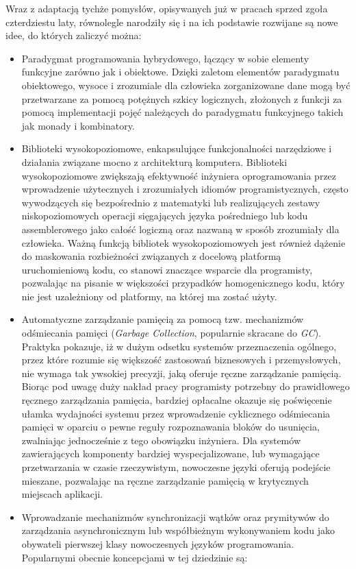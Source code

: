 \par{
Wraz z adaptacją tychże pomysłów, opisywanych już w pracach sprzed zgoła czterdziestu laty, równolegle narodziły się i na ich podstawie rozwijane są nowe idee, do których zaliczyć można:
\begin{itemize}
  \item Paradygmat programowania hybrydowego, łączący w sobie elementy funkcyjne zarówno jak i obiektowe. Dzięki zaletom elementów paradygmatu obiektowego, wysoce i zrozumiale dla człowieka zorganizowane dane mogą być przetwarzane za pomocą potężnych szkicy logicznych, złożonych z funkcji za pomocą implementacji pojęć należących do paradygmatu funkcyjnego takich jak monady i kombinatory.
  \item Biblioteki wysokopoziomowe, enkapsulujące funkcjonalności narzędziowe i działania związane mocno z architekturą komputera. Biblioteki wysokopoziomowe zwiększają efektywność inżyniera oprogramowania przez wprowadzenie użytecznych i zrozumiałych idiomów programistycznych, często wywodzących się bezpośrednio z matematyki lub realizujących zestawy niskopoziomowych operacji sięgających języka pośredniego lub kodu assemblerowego jako całość logiczną oraz nazwaną w sposób zrozumiały dla człowieka. Ważną funkcją bibliotek wysokopoziomowych jest również dążenie do maskowania rozbieżności związanych z docelową platformą uruchomieniową kodu, co stanowi znaczące wsparcie dla programisty, pozwalając na pisanie w większości przypadków homogenicznego kodu, który nie jest uzależniony od platformy, na której ma zostać użyty.
  \item Automatyczne zarządzanie pamięcią za pomocą tzw. mechanizmów odśmiecania pamięci (\emph{Garbage Collection}, popularnie skracane do \emph{GC}). Praktyka pokazuje, iż w dużym odsetku systemów przeznaczenia ogólnego, przez które rozumie się większość zastosowań biznesowych i przemysłowych, nie wymaga tak ywsokiej precyzji, jaką oferuje ręczne zarządzanie pamięcią. Biorąc pod uwagę duży nakład pracy programisty potrzebny do prawidłowego ręcznego zarządzania pamięcia, bardziej opłacalne okazuje się poświęcenie ułamka wydajności systemu przez wprowadzenie cyklicznego odśmiecania pamięci w oparciu o pewne reguły rozpoznawania bloków do usunięcia, zwalniając jednocześnie z tego obowiązku inżyniera. Dla systemów zawierających komponenty bardziej wyspecjalizowane, lub wymagające przetwarzania w czasie rzeczywistym, nowoczesne języki oferują podejście mieszane, pozwalając na ręczne zarządzanie pamięcią w krytycznych miejscach aplikacji.
  \item Wprowadzanie mechanizmów synchronizacji wątków oraz prymitywów do zarządzania asynchronicznym lub współbieżnym wykonywaniem kodu jako obywateli pierwszej klasy nowoczesnych języków programowania. Popularnymi obecnie koncepcjami w tej dziedzinie są:

\end{itemize}}
